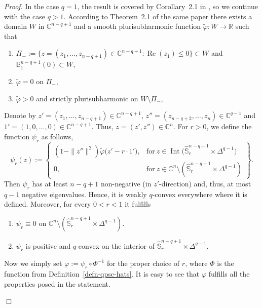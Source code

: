 \documentclass[11pt,a4paper]{article}
\newenvironment{proof}{\noindent\textit{Proof. }}{\hfill $\Box$\linebreak}
\newcommand{\BB}{\mathbb{B}}
\newcommand{\CC}{\mathbb{C}}
\newcommand{\RR}{\mathbb{R}}
\renewcommand{\SS}{\mathbb{S}}
\newcommand{\Repa}[1]{\operatorname{Re}(#1)}
\begin{document}
\begin{proof} In the case $q=1$, the result is covered by Corollary~2.1 in \cite{Shc21}, so we continue with the case $q>1$. According to Theorem~2.1 of the same paper there exists a domain $W$ in $\CC^{n-q+1}$ and a smooth plurisubharmonic function $\tilde{\varphi}:W\to\RR$ such that
\begin{enumerate}
 
\item[i.] $\Pi_-:=\{z=(z_1,\ldots,z_{n-q+1}) \in \CC^{n-q+1} : \Repa{z_1}\leq 0\} \subset W$ and $\BB_1^{n-q+1}(0) \subset W$,

\item[ii.] $\tilde{\varphi}= 0$ on $\Pi_-$,

\item[iii.] $\tilde{\varphi}>0$ and strictly plurisubharmonic on $W\setminus\Pi_-$,

\end{enumerate}

Denote by $z'=(z_1,\ldots,z_{n-q+1}) \in \CC^{n-q+1}$, $z''=(z_{n-q+2},\ldots,z_n) \in \CC^{q-1}$ and $1'=(1,0,\ldots,0) \in \CC^{n-q+1}$. Thus, $z=(z',z'') \in \CC^n$. For $r>0$, we define the function $\psi_r$ as follows,
\[
\psi_r(z):= \left\{ \begin{array}{cl}(1-\|z''\|^2)\tilde{\varphi}\big( z'-r\cdot 1'\big), & \text{for}\ z \in \operatorname{Int}\big(\widehat{\SS}_r^{n-q+1}\times\Delta^{q-1}\big)\\
0, & \text{for}\ z \in \CC^n\setminus (\widehat{\SS}_r^{n-q+1}\times\Delta^{q-1}) \end{array} \right\}.
\]
Then $\psi_r$ has at least $n-q+1$ non-negative (in $z'$-direction) and, thus, at most $q-1$ negative eigenvalues. Hence, it is weakly $q$-convex everywhere where it is defined. Moreover, for every $0<r<1$ it fulfills

\begin{enumerate}

\item $\psi_r \equiv 0$ on $\CC^n\setminus (\widehat{\SS}_r^{n-q+1}\times\Delta^{q-1})$.

\item $\psi_r$ is positive and $q$-convex on the interior of $\widehat{\SS}_r^{n-q+1}\times\Delta^{q-1}$.

\end{enumerate}

Now we simply set $\varphi:=\psi_r \circ \Phi^{-1}$ for the proper choice of $r$, where $\Phi$ is the function from Definition~\ref{defn-qpsc-hats}. It is easy to see that $\varphi$ fulfills all the properties posed in the statement.

\end{proof}
\end{document}
